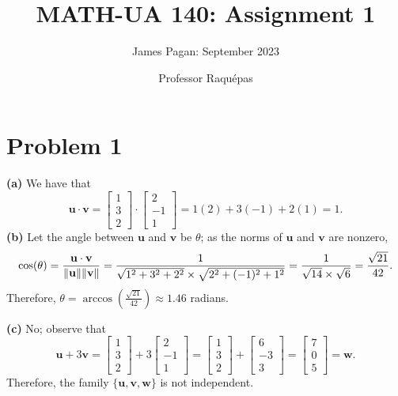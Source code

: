 \documentclass[11pt]{article}
\title{MATH-UA 140: Assignment 1}
\author{James Pagan: September 2023}
\date{Professor Raquépas}
\renewcommand{\vec}[1]{\mathbf{#1}}
\begin{document}
\maketitle
\tableofcontents


\section{Problem 1}

\textbf{(a)} We have that 
\[
	\vec{u} \cdot  \vec{v} = \begin{bmatrix} 1 \\ 3 \\  2 \end{bmatrix} \cdot \begin{bmatrix} 2 \\ -1 \\ 1 \end{bmatrix} = 1(2) + 3(-1) + 2(1) = 1.
\]
\textbf{(b)} Let the angle between $\vec{u}$ and $\vec{v}$ be $\theta$; as the norms of $\vec{u}$ and $\vec{v}$ are nonzero,
\[
	\cos(\theta) = \frac{\vec{u} \cdot \vec{v}}{\norm{\vec{u}}\norm{\vec{v}}} = \frac{1}{\sqrt{1^{2} + 3^{2} + 2^{2}} \times \sqrt{2^{2} + (-1)^{2} + 1^{2}}} = \frac{1}{\sqrt{14} \times \sqrt{6}} = \frac{\sqrt{21}}{42}.
\]
Therefore, $\theta = \arccos(\frac{\sqrt{21}}{42}) \approx 1.46$ radians.

\textbf{(c)} No; observe that
\[
	\vec{u} + 3 \vec{v} = \begin{bmatrix} 1 \\ 3 \\ 2\end{bmatrix} + 3 \begin{bmatrix} 2 \\ -1 \\ 1 \end{bmatrix} = \begin{bmatrix} 1 \\ 3 \\ 2 \end{bmatrix} + \begin{bmatrix} 6 \\ -3 \\ 3 \end{bmatrix} = \begin{bmatrix} 7 \\ 0 \\ 5 \end{bmatrix} = \vec{w}.
\]
Therefore, the family $\{ \vec{u}, \vec{v}, \vec{w} \}$ is not independent.
\end{document}
